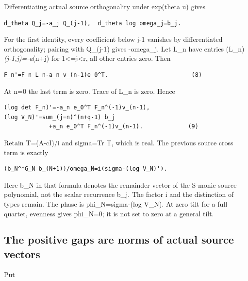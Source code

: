 Differentiating actual source orthogonality under exp(theta u) gives

\begin{Verbatim}[breaklines=true,breakanywhere=true,fontsize=\small]
d_theta Q_j=-a_j Q_(j-1),  d_theta log omega_j=b_j.
\end{Verbatim}

For the first identity, every coefficient below j-1 vanishes by
differentiated orthogonality; pairing with Q\_(j-1) gives -omega\_j. Let
L\_n have entries (L\_n)\emph{(j-1,j)=-a}(n+j) for
1\textless=j\textless r, all other entries zero. Then

\begin{Verbatim}[breaklines=true,breakanywhere=true,fontsize=\small]
F_n'=F_n L_n-a_n v_(n-1)e_0^T.                        (8)
\end{Verbatim}

At n=0 the last term is zero. Trace of L\_n is zero. Hence

\begin{Verbatim}[breaklines=true,breakanywhere=true,fontsize=\small]
(log det F_n)'=-a_n e_0^T F_n^(-1)v_(n-1),
(log V_N)'=sum_(j=n)^(n+q-1) b_j
             +a_n e_0^T F_n^(-1)v_(n-1).             (9)
\end{Verbatim}

Retain T=(A-cI)/i and sigma=Tr T, which is real. The previous source
cross term is exactly

\begin{Verbatim}[breaklines=true,breakanywhere=true,fontsize=\small]
(b_N^*G_N b_(N+1))/omega_N=i(sigma-(log V_N)').
\end{Verbatim}

Here b\_N in that formula denotes the remainder vector of the S-monic
source polynomial, not the scalar recurrence b\_j. The factor i and the
distinction of types remain. The phase is phi\_N=sigma-(log
V\_N)\textquotesingle. At zero tilt for a full quartet, evenness gives
phi\_N=0; it is not set to zero at a general tilt.

\subsection[\hspace{0.4em}The positive gaps are norms of actual source
vectors]{The positive gaps are norms of actual source
vectors}\label{confluent-transfer-the-positive-gaps-are-norms-of-actual-source-vectors}

Put

